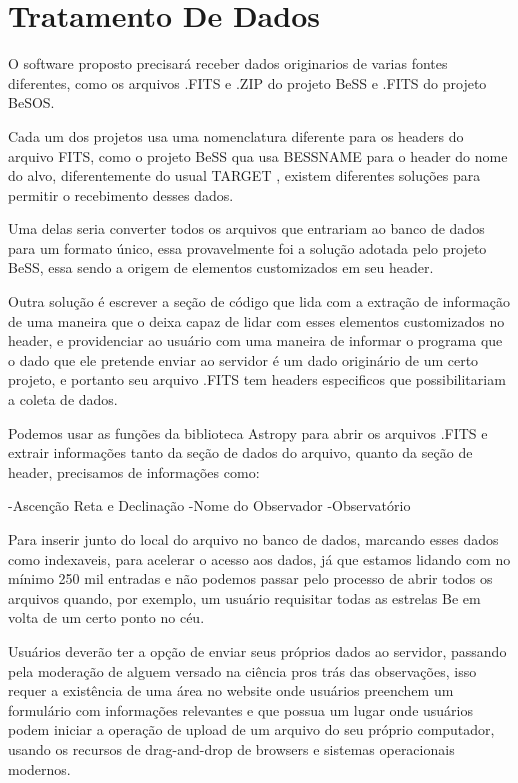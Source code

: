 \section{Tratamento De Dados}

O software proposto precisará receber dados originarios de varias fontes diferentes, como os arquivos .FITS e .ZIP do projeto BeSS e .FITS do projeto BeSOS. 

Cada um dos projetos usa uma nomenclatura diferente para os headers do arquivo FITS, como o projeto BeSS qua usa BESSNAME %
para o header do nome do alvo, diferentemente do usual TARGET %
, existem diferentes soluções para permitir o recebimento desses dados.

Uma delas seria converter todos os arquivos que entrariam ao banco de dados para um formato único, essa provavelmente foi a solução adotada pelo projeto BeSS, essa sendo a origem de elementos customizados em seu header.

Outra solução é escrever a seção de código que lida com a extração de informação de uma maneira que o deixa capaz de lidar com esses elementos customizados no header, e providenciar ao usuário com uma maneira de informar o programa que o dado que ele pretende enviar ao servidor é um dado originário de um certo projeto, e portanto seu arquivo .FITS tem headers especificos que possibilitariam a coleta de dados.

Podemos usar as funções da biblioteca Astropy para abrir os arquivos .FITS e extrair informações tanto da seção de dados do arquivo, quanto da seção de header, precisamos de informações como:

-Ascenção Reta e Declinação 
-Nome do Observador
-Observatório

Para inserir junto do local do arquivo no banco de dados, marcando esses dados como indexaveis, para acelerar o acesso aos dados, já que estamos lidando com no mínimo 250 mil entradas e não podemos passar pelo processo de abrir todos os arquivos quando, por exemplo, um usuário requisitar todas as estrelas Be em volta de um certo ponto no céu.

Usuários deverão ter a opção de enviar seus próprios dados ao servidor, passando pela moderação de alguem versado na ciência pros trás das observações, isso requer a existência de uma área no website onde usuários preenchem um formulário com informações relevantes e que possua um lugar onde usuários podem iniciar a operação de upload de um arquivo do seu próprio computador, usando os recursos de drag-and-drop de browsers e sistemas operacionais modernos.

